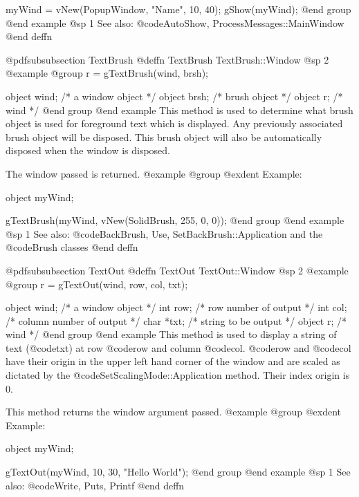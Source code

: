 myWind = vNew(PopupWindow, "Name", 10, 40);
gShow(myWind);
@end group
@end example
@sp 1
See also:  @code{AutoShow, ProcessMessages::MainWindow}
@end deffn









@pdfsubsubsection {TextBrush}
@deffn {TextBrush} TextBrush::Window
@sp 2
@example
@group
r = gTextBrush(wind, brsh);

object  wind;   /*  a window object   */
object  brsh;   /*  brush object      */
object  r;      /*  wind              */
@end group
@end example
This method is used to determine what brush object is used for foreground
text which is displayed.  Any previously associated brush object will
be disposed.  This brush object will also be automatically disposed when the
window is disposed.

The window passed is returned.
@example
@group
@exdent Example:

object  myWind;

gTextBrush(myWind, vNew(SolidBrush, 255, 0, 0));
@end group
@end example
@sp 1
See also:  @code{BackBrush, Use, SetBackBrush::Application}
        and the @code{Brush} classes
@end deffn










@pdfsubsubsection {TextOut}
@deffn {TextOut} TextOut::Window
@sp 2
@example
@group
r = gTextOut(wind, row, col, txt);

object  wind;   /*  a window object          */
int     row;    /*  row number of output     */
int     col;    /*  column number of output  */
char    *txt;   /*  string to be output      */
object  r;      /*  wind                     */
@end group
@end example
This method is used to display a string of text (@code{txt}) at row
@code{row} and column @code{col}.  @code{row} and @code{col} have their
origin in the upper left hand corner of the window and are scaled as
dictated by the @code{SetScalingMode::Application} method.
Their index origin is 0.

This method returns the window argument passed.
@example
@group
@exdent Example:

object  myWind;

gTextOut(myWind, 10, 30, "Hello World");
@end group
@end example
@sp 1
See also:  @code{Write, Puts, Printf}
@end deffn









